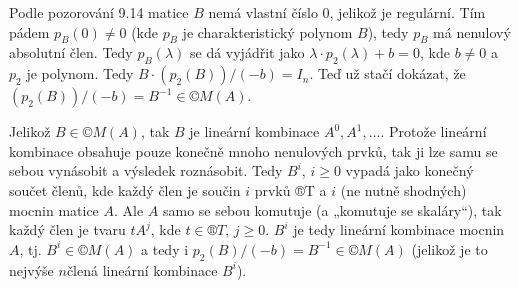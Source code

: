 \documentclass[10pt]{article}                   %
\begin{document}
\begin{priklad}[8.2]
    \begin{dukazin}[b]
        Podle pozorování 9.14 matice $B$ nemá vlastní číslo $0$, jelikož je regulární. Tím pádem $p_B(0) ≠ 0$ (kde $p_B$ je charakteristický polynom $B$), tedy $p_B$ má nenulový absolutní člen. Tedy $p_B(\lambda)$ se dá vyjádřit jako $\lambda·p_2(\lambda) + b = 0$, kde $b ≠ 0$ a $p_2$ je polynom. Tedy $B·(p_2(B))/(-b) = I_n$. Teď už stačí dokázat, že $(p_2(B))/(-b) = B^{-1} \in ©M(A)$.

        Jelikož $B \in ©M(A)$, tak $B$ je lineární kombinace $A^0, A^1, …$. Protože lineární kombinace obsahuje pouze konečně mnoho nenulových prvků, tak ji lze samu se sebou vynásobit a výsledek roznásobit. Tedy $B^i$, $i ≥ 0$ vypadá jako konečný součet členů, kde každý člen je součin $i$ prvků ®T a $i$ (ne nutně shodných) mocnin matice $A$. Ale $A$ samo se sebou komutuje (a „komutuje se skaláry“), tak každý člen je tvaru $tA^j$, kde $t \in ®T$, $j ≥ 0$. $B^i$ je tedy lineární kombinace mocnin $A$, tj. $B^i \in ©M(A)$ a tedy i $p_2(B)/(-b) = B^{-1} \in ©M(A)$ (jelikož je to nejvýše $n$člená lineární kombinace $B^i$).
    \end{dukazin}
\end{priklad}
\end{document}
